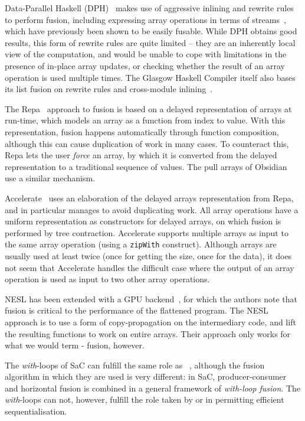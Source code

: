 Data-Parallel Haskell (DPH)~\cite{Chak06DPH} makes use of aggressive
inlining and rewrite rules to perform fusion, including expressing
array operations in terms of streams~\cite{coutts2007rewriting}, which
have previously been shown to be easily fusable.  While DPH obtains
good results, this form of rewrite rules are quite limited -- they are
an inherently local view of the computation, and would be unable to
cope with limitations in the presence of in-place array updates, or
checking whether the result of an array operation is used multiple
times.  The Glasgow Haskell Compiler itself also bases its list fusion
on rewrite rules and cross-module inlining~\cite{jones2001playing}.

The Repa~\cite{keller2010regular} approach to fusion is based on a
delayed representation of arrays at run-time, which models an array as
a function from index to value.  With this representation, fusion
happens automatically through function composition, although this can
cause duplication of work in many cases.  To counteract this, Repa
lets the user \textit{force} an array, by which it is converted from
the delayed representation to a traditional sequence of values.  The
pull arrays of Obsidian~\cite{claessen2012expressive} use a similar
mechanism.

Accelerate~\cite{mcdonell2013optimising} uses an elaboration of the
delayed arrays representation from Repa, and in particular manages to
avoid duplicating work.  All array operations have a uniform
representation as constructors for delayed arrays, on which fusion is
performed by tree contraction.  Accelerate supports multiple arrays as
input to the same array operation (using a \texttt{zipWith}
construct).  Although arrays are usually used at least twice (once for
getting the size, once for the data), it does not seem that Accelerate
handles the difficult case where the output of an array operation is
used as input to two other array operations.

NESL has been extended with a GPU backend~\cite{bergstrom2012nested},
for which the authors note that fusion is critical to the performance
of the flattened program.  The NESL approach is to use a form of
copy-propagation on the intermediary code, and lift the resulting
functions to work on entire arrays.  Their approach only works for
what we would term - fusion, however.

The \textit{with}-loops of SaC can fulfill the same role as
~\cite{Grelck:2005:WFD:2172471.2172483}, although the
fusion algorithm in which they are used is very different: in SaC,
producer-consumer and horizontal fusion is combined in a general
framework of \textit{with-loop fusion}.  The \textit{with}-loops can
not, however, fulfill the role taken by \StreamSeq{} or \StreamPar{}
in permitting efficient sequentialisation.

